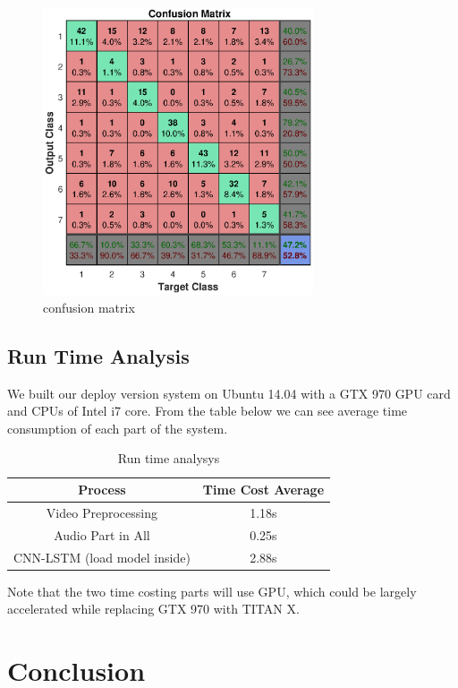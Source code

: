 \documentclass[10pt,twocolumn,letterpaper]{article}
\begin{document}
\begin{figure}[htpb]
	\centering
	\includegraphics[width = 8cm]{pic/res_confusion.eps}
	\caption{confusion matrix}
\end{figure}

\subsection{Run Time Analysis}

We built our deploy version system on Ubuntu 14.04 with a GTX 970 GPU card and CPUs of Intel i7 core. From the table below we can see average time consumption of each part of the system.

\begin{table}[htpb]
	\begin{center}
		\begin{tabular}{|c|c|}
			\hline
			\textbf{Process} & \textbf{Time Cost Average} \\
			\hline\hline
			Video Preprocessing & 1.18s\\
			Audio Part in All &  0.25s \\
			CNN-LSTM (load model inside) &  2.88s \\
			
			
			\hline
		\end{tabular}
	\end{center}
	\caption{Run time analysys}
	\label{runtime}
	
\end{table}

Note that the two time costing parts will use GPU, which could be largely accelerated while replacing GTX 970 with TITAN X.

\section{Conclusion}
\end{document}
